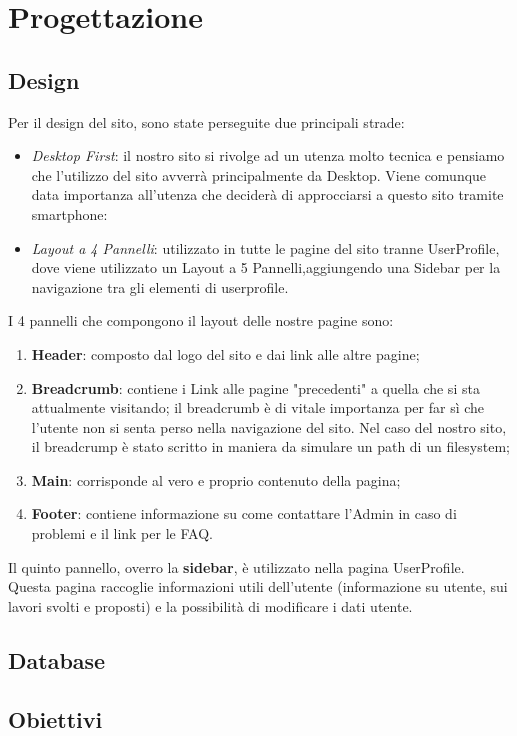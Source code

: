 \section{Progettazione}
	
  \subsection{Design}
  Per il design del sito, sono state perseguite due principali strade:
  \begin{itemize}
    \item \textit{Desktop First}: il nostro sito si rivolge ad un utenza molto tecnica e pensiamo che l'utilizzo del sito avverrà principalmente da Desktop. Viene comunque data importanza all'utenza che deciderà di approcciarsi a questo sito tramite smartphone:
    \item \textit{Layout a 4 Pannelli}: utilizzato in tutte le pagine del sito tranne UserProfile, dove viene utilizzato un Layout a 5 Pannelli,aggiungendo una Sidebar per la navigazione tra gli elementi di userprofile.
  \end{itemize}
  
I 4 pannelli che compongono il layout delle nostre pagine sono:
  \begin{enumerate}
    \item \textbf{Header}: composto dal logo del sito e dai link alle altre pagine;
    \item \textbf{Breadcrumb}: contiene i Link alle pagine "precedenti" a quella che si sta attualmente visitando; il breadcrumb è di vitale importanza per far sì che l'utente
      non si senta perso nella navigazione del sito. Nel caso del nostro sito, il breadcrump è stato scritto in maniera da simulare un path di un filesystem;
    \item \textbf{Main}: corrisponde al vero e proprio contenuto della pagina;
    \item \textbf{Footer}: contiene informazione su come contattare l'Admin in caso di problemi e il link per le FAQ.
  \end{enumerate}

  Il quinto pannello, overro la \textbf{sidebar}, è utilizzato nella pagina UserProfile. 
  Questa pagina raccoglie informazioni utili dell'utente (informazione su utente, sui lavori svolti e proposti) e la possibilità di modificare i dati utente.


  \subsection{Database}




  \subsection{Obiettivi}
  